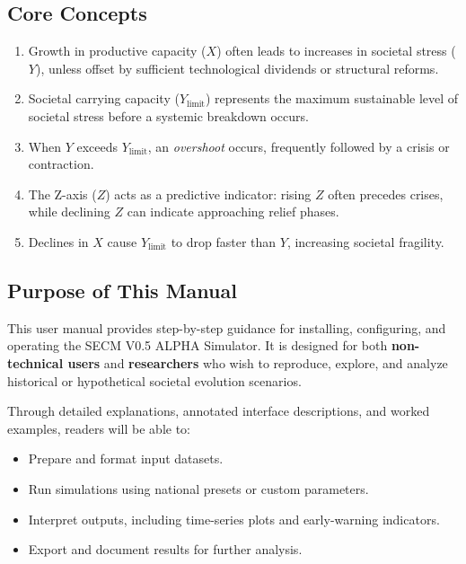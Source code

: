 \documentclass[12pt,a4paper]{article}
\begin{document}
\subsection{Core Concepts}
\begin{enumerate}
    \item Growth in productive capacity (\(X\)) often leads to 
    increases in societal stress (\(Y\)), unless offset by sufficient 
    technological dividends or structural reforms.
    
    \item Societal carrying capacity (\(Y_{\text{limit}}\)) represents 
    the maximum sustainable level of societal stress before a systemic 
    breakdown occurs.
    
    \item When \(Y\) exceeds \(Y_{\text{limit}}\), an \textit{overshoot} 
    occurs, frequently followed by a crisis or contraction.
    
    \item The Z-axis (\(Z\)) acts as a predictive indicator: 
    rising \(Z\) often precedes crises, while declining \(Z\) can 
    indicate approaching relief phases.
    
    \item Declines in \(X\) cause \(Y_{\text{limit}}\) to drop faster 
    than \(Y\), increasing societal fragility.
\end{enumerate}

\subsection{Purpose of This Manual}
This user manual provides step-by-step guidance for installing, configuring, 
and operating the SECM V0.5 ALPHA Simulator. It is designed for both 
\textbf{non-technical users} and \textbf{researchers} who wish to 
reproduce, explore, and analyze historical or hypothetical societal 
evolution scenarios.

\noindent
Through detailed explanations, annotated interface descriptions, and worked examples, 
readers will be able to:
\begin{itemize}
    \item Prepare and format input datasets.
    \item Run simulations using national presets or custom parameters.
    \item Interpret outputs, including time-series plots and 
    early-warning indicators.
    \item Export and document results for further analysis.
\end{itemize}
\end{document}
